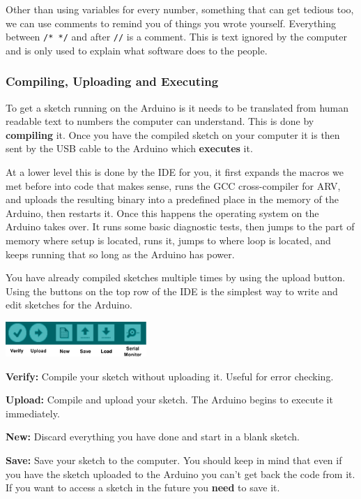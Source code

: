Other than using variables for every number,
something that can get tedious too,
we can use comments to remind you of things you wrote yourself.
Everything between \lstinline|/* */| and after \lstinline|//| is a comment.
This is text ignored by the computer 
and is only used to explain what software does to the people.


\subsubsection{Compiling, Uploading and Executing}

To get a sketch running on the Arduino is it needs to be
translated from human readable text to numbers the computer can understand.
This is done by \textbf{compiling} it. 
Once you have the compiled sketch on your computer it is then
sent by the USB cable to the Arduino which \textbf{executes} it.

At a lower level this is done by the IDE for you,
it first expands the macros we met before into code that makes sense,
runs the GCC cross-compiler for ARV,
and uploads the resulting binary into a predefined place in the memory of the Arduino,
then restarts it.
Once this happens the operating system on the Arduino takes over.
It runs some basic diagnostic tests,
then jumps to the part of memory where setup is located,
runs it,
jumps to where loop is located,
and keeps running that so long as the Arduino has power.

You have already compiled sketches multiple times
by using the upload button.
Using the buttons on the top row of the IDE is the simplest way to
write and edit sketches for the Arduino.

\begin{center}
    \includegraphics[width=0.4\textwidth]{./Graphics/uploading.pdf}
\end{center}

\textbf{Verify:} Compile your sketch without uploading it. Useful for error checking.

\textbf{Upload:} Compile and upload your sketch.
The Arduino begins to execute it immediately.

\textbf{New:} Discard everything you have done and start in a blank sketch.

\textbf{Save:} Save your sketch to the computer.
You should keep in mind that even if you have the sketch uploaded to the Arduino
you can't get back the code from it.
If you want to access a sketch in the future you \textbf{need} to save it.

